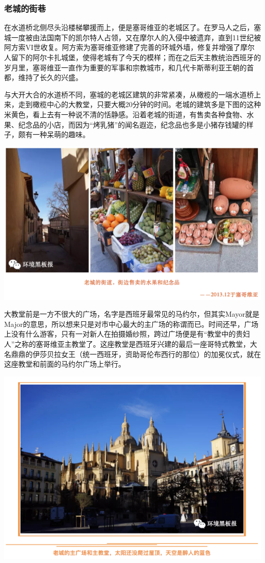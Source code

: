 \documentclass[]{book}
\begin{document}
\hypertarget{ux8001ux57ceux7684ux8857ux5df7}{%
\subsubsection{老城的街巷}\label{ux8001ux57ceux7684ux8857ux5df7}}

在水道桥北侧尽头沿楼梯攀援而上，便是塞哥维亚的老城区了。在罗马人之后，塞城一度被由法国南下的凯尔特人占领，又在摩尔人的入侵中被遗弃，直到11世纪被阿方索VI世收复。阿方索为塞哥维亚修建了完善的环城外墙，修复并增强了摩尔人留下的阿尔卡扎城堡，使得老城有了今天的模样；而在之后天主教统治西班牙的岁月里，塞哥维亚一直作为重要的军事和宗教城市，和几代卡斯蒂利亚王朝的首都，维持了长久的兴盛。

与大开大合的水道桥不同，塞城的老城区建筑的非常紧凑，从橄榄的一端水道桥上来，走到橄榄中心的大教堂，只要大概20分钟的时间。老城的建筑多是下图的这种米黄色，看上去有一种说不清的恬静感。沿着老城的街道，有售卖各种食物、水果、纪念品的小店，而因为``烤乳猪''的闻名遐迩，纪念品也多是小猪存钱罐的样子，颇有一种呆萌的趣味。

\includegraphics[width=8.33in]{images/xt49}

大教堂前是一方不很大的广场，名字是西班牙最常见的马约尔，但其实Mayor就是Major的意思，所以想来只是对市中心最大的主广场的称谓而已。时间还早，广场上没有什么游客，只有一对新人在拍摄婚纱照，跨过广场便是有``教堂中的贵妇人''之称的塞哥维亚主教堂了。这座教堂是西班牙兴建的最后一座哥特式教堂，大名鼎鼎的伊莎贝拉女王（统一西班牙，资助哥伦布西行的那位）的加冕仪式，就在这座教堂和前面的马约尔广场上举行。

\includegraphics[width=8.33in]{images/xt50}
\end{document}
